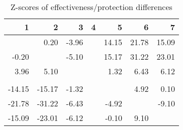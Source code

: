 \begin{table}[ht]
\centering
\begin{tabular}{rrrrrrr}
  \hline
1 & 2 & 3 & 4 & 5 & 6 & 7 \\ 
  \hline
 & 0.20 & -3.96 &  & 14.15 & 21.78 & 15.09 \\ 
  -0.20 &  & -5.10 &  & 15.17 & 31.22 & 23.01 \\ 
  3.96 & 5.10 &  &  & 1.32 & 6.43 & 6.12 \\ 
   &  &  &  &  &  &  \\ 
  -14.15 & -15.17 & -1.32 &  &  & 4.92 & 0.10 \\ 
  -21.78 & -31.22 & -6.43 &  & -4.92 &  & -9.10 \\ 
  -15.09 & -23.01 & -6.12 &  & -0.10 & 9.10 &  \\ 
   \hline
\end{tabular}
\caption{Z-scores of effectiveness/protection differences} 
\end{table}
